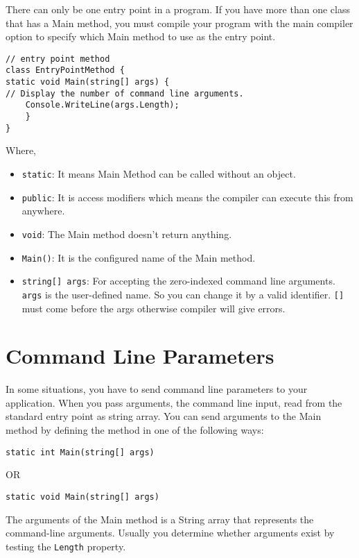 There can only be one entry point in a {\cs} program. If you have more than one class that has a Main method, you must compile your program with the main compiler option to specify which Main method to use as the entry point.
\begin{lstlisting}[numbers=none]
// entry point method
class EntryPointMethod {
static void Main(string[] args) {
// Display the number of command line arguments.
	Console.WriteLine(args.Length);
	}
}   
\end{lstlisting}

Where,
\begin{itemize}
	\item \verb|static|: It means Main Method can be called without an object.
	\item \verb|public|: It is access modifiers which means the  compiler can execute this from anywhere.
	\item \verb|void|: The Main method doesn’t return anything.
	\item \verb|Main()|: It is the configured name of the Main method.
	\item \verb|string[] args|: For accepting the zero-indexed command line arguments. \texttt{args} is the user-defined name. So you can change it by a valid identifier. \verb|[]| must come before the args otherwise compiler will give errors.
\end{itemize}



\section{Command Line Parameters}
In some situations, you have to send command line parameters to your application. When you pass arguments, the command line input, read from the standard entry point as string array.
You can send arguments to the Main method by defining the method in one of the following ways:

\begin{lstlisting}[numbers=none]
static int Main(string[] args)
\end{lstlisting}

OR

\begin{lstlisting}[numbers=none]
static void Main(string[] args)
\end{lstlisting}

The arguments of the Main method is a String array that represents the command-line arguments. Usually you determine whether arguments exist by testing the \texttt{Length} property.

